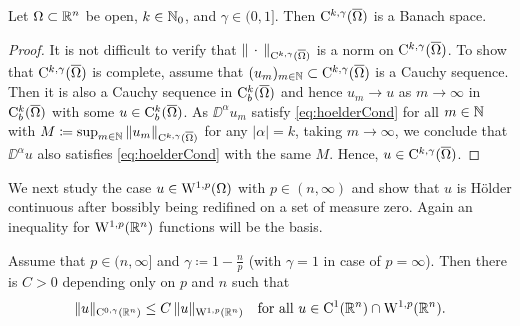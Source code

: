 \begin{prop}
  Let $\Omega \subset \mathbb{R}^n$ be open, $k \in \mathbb{N}_0$, and $\gamma \in (0,1]$.
  Then $\mathrm{C}^{k,\gamma}(\overline\Omega)$ is a Banach space.
\end{prop}

\begin{proof}
  It is not difficult to verify that $\| \,\cdot\, \|_{\mathrm{C}^{k,\gamma}(\overline\Omega)}$ is a norm on $\mathrm{C}^{k,\gamma}(\overline\Omega)$.
  To show that $\mathrm{C}^{k,\gamma}(\overline\Omega)$ is complete, assume that $(u_m)_{m \in \mathbb{N}} \subset \mathrm{C}^{k,\gamma}(\overline\Omega)$ is a Cauchy sequence.
  Then it is also a Cauchy sequence in $\mathrm{C}_b^k(\overline\Omega)$ and hence $u_m \to u$ as $m \to \infty$ in $\mathrm{C}_b^k(\overline\Omega)$ with some $u \in \mathrm{C}_b^k(\overline\Omega)$.
  As $\DD^\alpha u_m$ satisfy \eqref{eq:hoelderCond} for all $m \in \mathbb{N}$ with $M \coloneqq \sup_{m \in \mathbb{N}} \| u_m\|_{\mathrm{C}^{k,\gamma}(\overline\Omega)}$ for any $|\alpha| = k$, taking $m \to \infty$, we conclude that $\DD^\alpha u$ also satisfies \eqref{eq:hoelderCond} with the same $M$.
  Hence, $u \in \mathrm{C}^{k,\gamma}(\overline\Omega)$.
\end{proof}

We next study the case $u \in \mathrm{W}^{1,p}(\Omega)$ with $p \in (n,\infty)$ and show that $u$ is Hölder continuous after bossibly being redifined on a set of measure zero.
Again an inequality for $\mathrm{W}^{1,p}(\mathbb{R}^n)$ functions will be the basis.

\begin{thm}
Assume that $p \in (n,\infty]$ and $\gamma \coloneqq 1 - \frac{n}{p}$ (with $\gamma = 1$ in case of $p = \infty$).
Then there is $C > 0$ depending only on $p$ and $n$ such that
\begin{equation}
  \label{eq:morrey}
  \|u\|_{\mathrm{C}^{0,\gamma}(\mathbb{R}^n)} \leq C \, \|u\|_{\mathrm{W}^{1,p}(\mathbb{R}^n)} \quad\text{for all } u \in \mathrm{C}^1(\mathbb{R}^n) \cap \mathrm{W}^{1,p}(\mathbb{R}^n).
\end{equation}
\end{thm}

